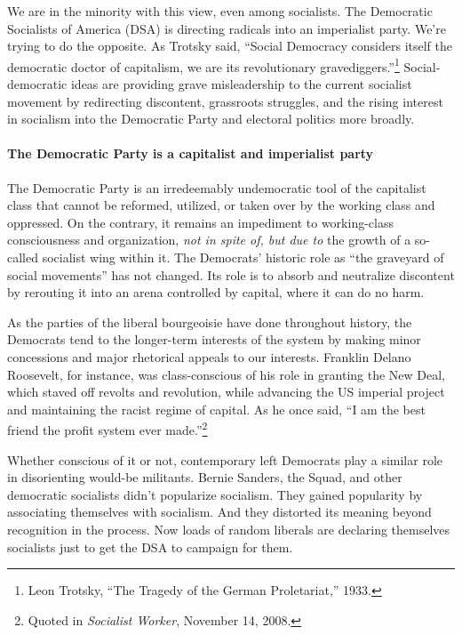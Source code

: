 We are in the minority with this view, even among socialists. The Democratic Socialists of America (DSA) is directing radicals into an imperialist party. We're trying to do the opposite. As Trotsky said, ``Social Democracy considers itself the democratic doctor of capitalism, we are its revolutionary gravediggers.''\footnote{Leon Trotsky, ``The Tragedy of the German Proletariat,'' 1933.} Social-democratic ideas are providing grave misleadership to the current socialist movement by redirecting discontent, grassroots struggles, and the rising interest in socialism into the Democratic Party and electoral politics more broadly.

\paragraph{The Democratic Party is a capitalist and imperialist party}

The Democratic Party is an irredeemably undemocratic tool of the capitalist class that cannot be reformed, utilized, or taken over by the working class and oppressed. On the contrary, it remains an impediment to working-class consciousness and organization, \emph{not in spite of, but due to} the growth of a so-called socialist wing within it. The Democrats' historic role as ``the graveyard of social movements'' has not changed. Its role is to absorb and neutralize discontent by rerouting it into an arena controlled by capital, where it can do no harm.

As the parties of the liberal bourgeoisie have done throughout history, the Democrats tend to the longer-term interests of the system by making minor concessions and major rhetorical appeals to our interests. Franklin Delano Roosevelt, for instance, was class-conscious of his role in granting the New Deal, which staved off revolts and revolution, while advancing the US imperial project and maintaining the racist regime of capital. As he once said, ``I am the best friend the profit system ever made.''\footnote{Quoted in \emph{Socialist Worker}, November 14, 2008.}

Whether conscious of it or not, contemporary left Democrats play a similar role in disorienting would-be militants. Bernie Sanders, the Squad, and other democratic socialists didn't popularize socialism. They gained popularity by associating themselves with socialism. And they distorted its meaning beyond recognition in the process. Now loads of random liberals are declaring themselves socialists just to get the DSA to campaign for them.


